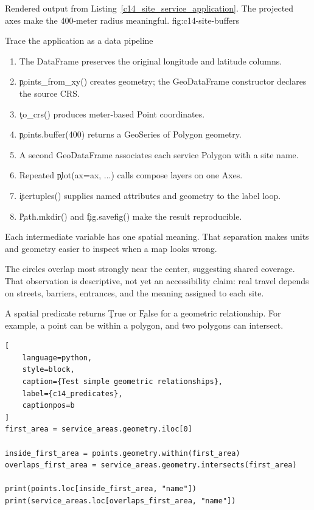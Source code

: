 {Rendered output from Listing~\ref{c14_site_service_application}. The projected axes make the 400-meter radius meaningful.}
{fig:c14-site-buffers}

\begin{SyntaxBox}{Trace the application as a data pipeline}
\begin{enumerate}
    \item The DataFrame preserves the original longitude and latitude columns.
    \item \c{points_from_xy()} creates geometry; the GeoDataFrame constructor
          declares the source CRS.
    \item \c{to_crs()} produces meter-based Point coordinates.
    \item \c{points.buffer(400)} returns a GeoSeries of Polygon geometry.
    \item A second GeoDataFrame associates each service Polygon with a site name.
    \item Repeated \c{plot(ax=ax, ...)} calls compose layers on one Axes.
    \item \c{itertuples()} supplies named attributes and geometry to the label loop.
    \item \c{Path.mkdir()} and \c{fig.savefig()} make the result reproducible.
\end{enumerate}
Each intermediate variable has one spatial meaning. That separation makes
units and geometry easier to inspect when a map looks wrong.
\end{SyntaxBox}

The circles overlap most strongly near the center, suggesting shared coverage.
That observation is descriptive, not yet an accessibility claim: real travel
depends on streets, barriers, entrances, and the meaning assigned to each site.


A spatial predicate returns \c{True} or \c{False} for a geometric relationship.
For example, a point can be within a polygon, and two polygons can intersect.

\begin{lstlisting}[
    language=python,
    style=block,
    caption={Test simple geometric relationships},
    label={c14_predicates},
    captionpos=b
]
first_area = service_areas.geometry.iloc[0]

inside_first_area = points.geometry.within(first_area)
overlaps_first_area = service_areas.geometry.intersects(first_area)

print(points.loc[inside_first_area, "name"])
print(service_areas.loc[overlaps_first_area, "name"])
\end{lstlisting}

